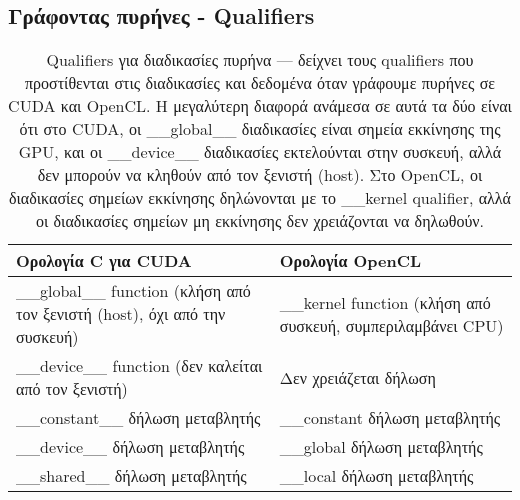 \subsection{Γράφοντας πυρήνες - Qualifiers}
\begin{table}[!htbp]
	\begin{tabular}{|p{8cm}|p{8cm}|}
	\hline 
	\rowcolor[HTML]{C0C0C0} 
	Ορολογία C για CUDA & Ορολογία OpenCL \\ \hline
	\_\_global\_\_ function (κλήση από τον ξενιστή (host), όχι από την συσκευή) & \_\_kernel function (κλήση από συσκευή, συμπεριλαμβάνει CPU) \\ \hline
	\_\_device\_\_ function (δεν καλείται από τον ξενιστή) & Δεν χρειάζεται δήλωση \\ \hline
	\_\_constant\_\_ δήλωση μεταβλητής & \_\_constant δήλωση μεταβλητής \\ \hline
	\_\_device\_\_ δήλωση μεταβλητής & \_\_global δήλωση μεταβλητής \\ \hline
	\_\_shared\_\_ δήλωση μεταβλητής & \_\_local δήλωση μεταβλητής \\ \hline
	\end{tabular}
	\caption{Qualifiers για διαδικασίες πυρήνα — δείχνει τους qualifiers που προστίθενται στις διαδικασίες και δεδομένα  όταν γράφουμε πυρήνες σε CUDA και OpenCL. Η μεγαλύτερη διαφορά ανάμεσα σε αυτά τα δύο είναι ότι στο CUDA, οι \_\_global\_\_ διαδικασίες είναι σημεία εκκίνησης της GPU, και οι \_\_device\_\_ διαδικασίες εκτελούνται στην συσκευή, αλλά δεν μπορούν να κληθούν από τον ξενιστή (host). Στο OpenCL, οι διαδικασίες σημείων εκκίνησης δηλώνονται με το \_\_kernel qualifier, αλλά οι διαδικασίες σημείων μη εκκίνησης δεν χρειάζονται να δηλωθούν.}
\end{table}
\clearpage
